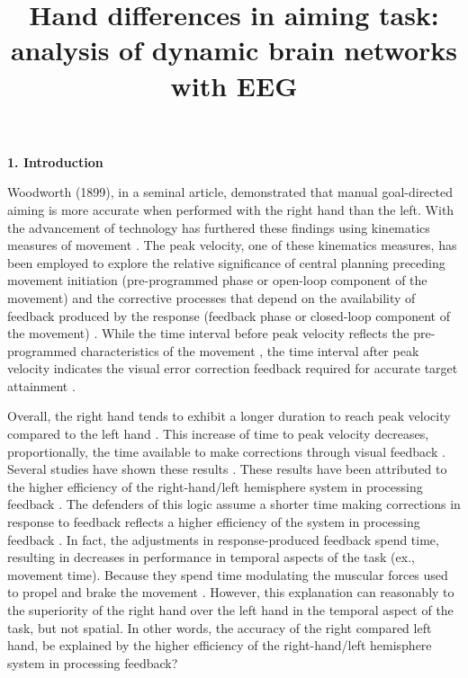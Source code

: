 \documentclass[man,a4paper,12pt,floatsintext]{apa6}
\title{Hand differences in aiming task: analysis of dynamic brain networks with EEG}
\begin{document}
\maketitle



\begin{flushleft}
\textbf{1. Introduction}
\end{flushleft}

Woodworth (1899), in a seminal article, demonstrated that manual goal-directed aiming is more accurate when performed with the right hand than the left. With the advancement of technology has furthered these findings using kinematics measures of movement \citep{Elliott2000}. The peak velocity, one of these kinematics measures, has been employed to explore the relative significance of central planning preceding movement initiation (pre-programmed phase or open-loop component of the movement) and the corrective processes that depend on the availability of feedback produced by the response (feedback phase or closed-loop component of the movement) \citep{Elliott2001b}. While the time interval before peak velocity reflects the pre-programmed characteristics of the movement \citep{Carlton1992}, the time interval after peak velocity indicates the visual error correction feedback required for accurate target attainment \citep{Elliott2010d}. 

Overall, the right hand tends to exhibit a longer duration to reach peak velocity compared to the left hand \citep{Mieschke2001b,Elliott1996}. This increase of time to peak velocity decreases, proportionally, the time available to make corrections through visual feedback \citep{Elliott1999a}. Several studies have shown these results \citep{Lavrysen2007,Lavrysen2012b,Roy1994,Buekers2000,Fernandes2022a}.	These results have been attributed to the higher efficiency of the right-hand/left hemisphere system in processing feedback \citep{Flowers1975a,Todor1978}. The defenders of this logic assume a shorter time making corrections in response to feedback reflects a higher efficiency of the system in processing feedback \citep{Cohen1973,Halperin1973}. In fact, the adjustments in response-produced feedback spend time, resulting in decreases in performance in temporal aspects of the task (ex., movement time)\citep{Meyer1988}. Because they spend time modulating the muscular forces used to propel and brake the movement \citep{Elliott2001b}. However, this explanation can reasonably to the superiority of the right hand over the left hand in the temporal aspect of the task, but not spatial. In other words, the accuracy of the right compared left hand,  be explained by the higher efficiency of the right-hand/left hemisphere system in processing feedback? 
\end{document}
